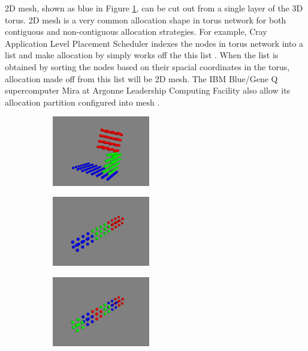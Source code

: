 \documentclass[conference]{IEEEtran}
\begin{document}
2D mesh, shown as blue in Figure \ref{fig:cont_sub1}, can be cut out from a single layer of the 3D torus. 2D mesh is a very common allocation shape in torus network for both contiguous and non-contiguous allocation strategies. For example, Cray Application Level Placement Scheduler indexes the nodes in torus network into a list and make allocation by simply works off the this list \cite{carl-cug}. When the list is obtained by sorting the nodes based on their spacial coordinates in the torus, allocation made off from this list will be 2D mesh. The IBM Blue/Gene Q supercomputer Mira at Argonne Leadership Computing Facility also allow its allocation partition configured into mesh \cite{zhou-ipdps}. 

\begin{figure}[t!]
    \centering
    \begin{subfigure}[t]{0.2\textwidth}
        \centering
        \includegraphics[height=1.2in]{figs/allocshape/allocation}
        \caption{ }
        \label{fig:cont_sub1}
    \end{subfigure}%
    \hspace{1em}%
    \begin{subfigure}[t]{0.2\textwidth}
        \centering
        \includegraphics[height=1.2in]{figs/allocshape/unitsize/unit16}
        \caption{ }
        \label{fig:noncont_sub1}
    \end{subfigure}%
    \begin{subfigure}[t]{0.2\textwidth}
        \centering
        \includegraphics[height=1.2in]{figs/allocshape/unitsize/unit8}

\end{subfigure}
\end{figure}
\end{document}
